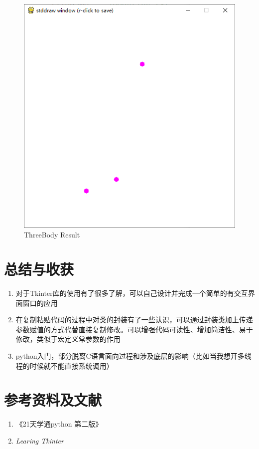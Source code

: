 \documentclass[]{report}
\begin{document}
\begin{figure}[h]
\begin{minipage}{18em}
				\includegraphics[scale=0.48]{pics/ThreeBody.PNG}
				\caption{ThreeBody Result}
			\end{minipage}
		\end{figure}

	\chapter{总结与收获}
		\begin{enumerate}
			\item 对于Tkinter库的使用有了很多了解，可以自己设计并完成一个简单的有交互界面窗口的应用
			\item 在复制粘贴代码的过程中对类的封装有了一些认识，可以通过封装类加上传递参数赋值的方式代替直接复制修改。可以增强代码可读性、增加简洁性、易于修改，类似于宏定义常参数的作用
			\item python入门，部分脱离C语言面向过程和涉及底层的影响（比如当我想开多线程的时候就不能直接系统调用）
		\end{enumerate}

	\chapter{参考资料及文献}
		\begin{enumerate}
			\item 《21天学通python 第二版》
			\item \textit{Learing Tkinter}
		\end{enumerate}
\end{document}
